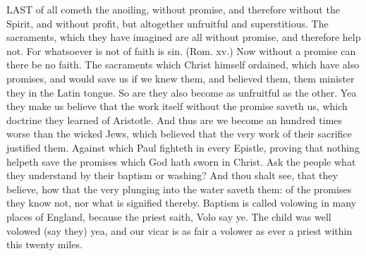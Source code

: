LAST of all cometh the anoiling, without promise, and 
therefore without the Spirit, and without profit, but altogether
unfruitful and superstitious. The sacraments, 
which they have imagined are all without promise, and 
therefore help not. For whatsoever is not of faith is sin. 
(Rom. xv.) Now without a promise can there be no
faith. The sacraments which Christ himself ordained,
which have also promises, and would save us if we knew
them, and believed them, them minister they in the Latin
tongue. So are they also become as unfruitful as the
other. Yea they make us believe that the work itself 
without the promise saveth us, which doctrine they learned 
of Aristotle. And thus are we become an hundred times 
worse than the wicked Jews, which believed that the very 
work of their sacrifice justified them. Against which 
Paul fighteth in every Epistle, proving that nothing helpeth 
save the promises which God hath sworn in Christ. 
Ask the people what they understand by their baptism or 
washing? And thou shalt see, that they believe, how that 
the very plunging into the water saveth them: of the promises
they know not, nor what is signified thereby. Baptism
is called volowing in many places of England, because 
the priest saith, Volo say ye. The child was well volowed 
(say they) yea, and our vicar is as fair a volower as ever a 
priest within this twenty miles. 

